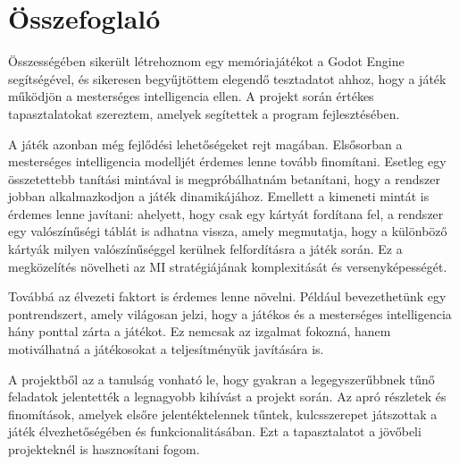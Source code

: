 \chapter{Összefoglaló}

\thispagestyle{fancy}
\pagestyle{fancy}

Összességében sikerült létrehoznom egy memóriajátékot a Godot Engine segítségével, és sikeresen begyűjtöttem elegendő tesztadatot ahhoz, hogy a játék működjön a mesterséges intelligencia ellen. A projekt során értékes tapasztalatokat szereztem, amelyek segítettek a program fejlesztésében.

A játék azonban még fejlődési lehetőségeket rejt magában. Elsősorban a mesterséges intelligencia modelljét érdemes lenne tovább finomítani. Esetleg egy összetettebb tanítási mintával is megpróbálhatnám betanítani, hogy a rendszer jobban alkalmazkodjon a játék dinamikájához. Emellett a kimeneti mintát is érdemes lenne javítani: ahelyett, hogy csak egy kártyát fordítana fel, a rendszer egy valószínűségi táblát is adhatna vissza, amely megmutatja, hogy a különböző kártyák milyen valószínűséggel kerülnek felfordításra a játék során. Ez a megközelítés növelheti az MI stratégiájának komplexitását és versenyképességét.

Továbbá az élvezeti faktort is érdemes lenne növelni. Például bevezethetünk egy pontrendszert, amely világosan jelzi, hogy a játékos és a mesterséges intelligencia hány ponttal zárta a játékot. Ez nemcsak az izgalmat fokozná, hanem motiválhatná a játékosokat a teljesítményük javítására is.

A projektből az a tanulság vonható le, hogy gyakran a legegyszerűbbnek tűnő feladatok jelentették a legnagyobb kihívást a projekt során. Az apró részletek és finomítások, amelyek elsőre jelentéktelennek tűntek, kulcsszerepet játszottak a játék élvezhetőségében és funkcionalitásában. Ezt a tapasztalatot a jövőbeli projekteknél is hasznosítani fogom.


